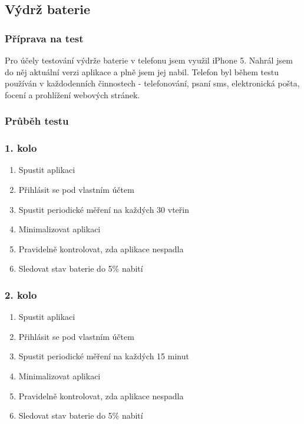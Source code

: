 \newpage

\subsection{Výdrž baterie}

\subsubsection{Příprava na test}
Pro účely testování výdrže baterie v telefonu jsem využil iPhone 5. Nahrál jsem do něj aktuální verzi aplikace a plně jsem jej nabil. Telefon byl během testu používán v každodenních činnostech - telefonování, psaní sms, elektronická pošta, focení a prohlížení webových stránek.

\subsubsection{Průběh testu}

\subsubsection*{1. kolo}

\begin{enumerate}
	\item Spustit aplikaci
	\item Přihlásit se pod vlastním účtem
	\item Spustit periodické měření na každých 30 vteřin
	\item Minimalizovat aplikaci
	\item Pravidelně kontrolovat, zda aplikace nespadla
	\item Sledovat stav baterie do 5\% nabití
\end{enumerate}

\subsubsection*{2. kolo}

\begin{enumerate}
	\item Spustit aplikaci
	\item Přihlásit se pod vlastním účtem
	\item Spustit periodické měření na každých 15 minut
	\item Minimalizovat aplikaci
	\item Pravidelně kontrolovat, zda aplikace nespadla
	\item Sledovat stav baterie do 5\% nabití
\end{enumerate}

